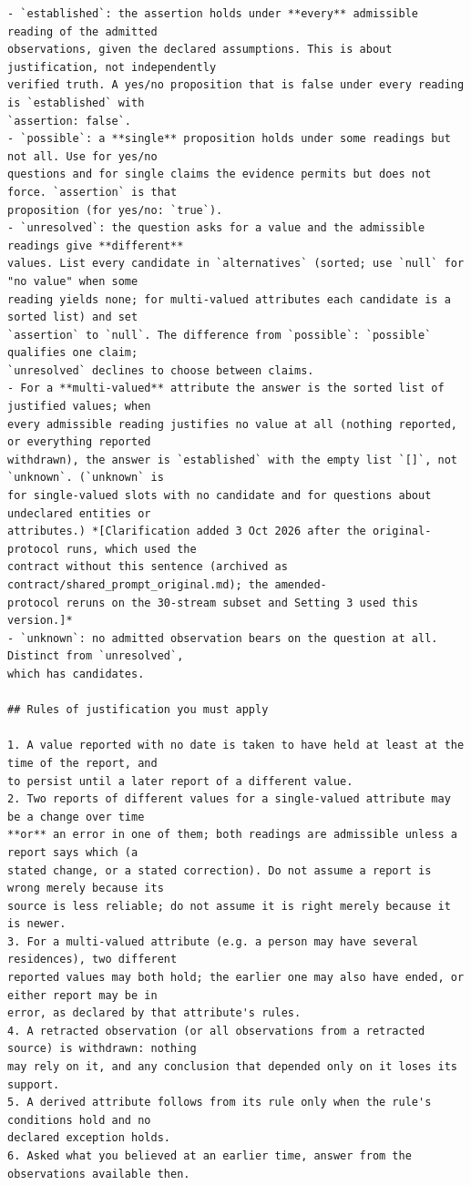 {\begin{verbatim}
- `established`: the assertion holds under **every** admissible reading of the admitted
observations, given the declared assumptions. This is about justification, not independently
verified truth. A yes/no proposition that is false under every reading is `established` with
`assertion: false`.
- `possible`: a **single** proposition holds under some readings but not all. Use for yes/no
questions and for single claims the evidence permits but does not force. `assertion` is that
proposition (for yes/no: `true`).
- `unresolved`: the question asks for a value and the admissible readings give **different**
values. List every candidate in `alternatives` (sorted; use `null` for "no value" when some
reading yields none; for multi-valued attributes each candidate is a sorted list) and set
`assertion` to `null`. The difference from `possible`: `possible` qualifies one claim;
`unresolved` declines to choose between claims.
- For a **multi-valued** attribute the answer is the sorted list of justified values; when
every admissible reading justifies no value at all (nothing reported, or everything reported
withdrawn), the answer is `established` with the empty list `[]`, not `unknown`. (`unknown` is
for single-valued slots with no candidate and for questions about undeclared entities or
attributes.) *[Clarification added 3 Oct 2026 after the original-protocol runs, which used the
contract without this sentence (archived as contract/shared_prompt_original.md); the amended-
protocol reruns on the 30-stream subset and Setting 3 used this version.]*
- `unknown`: no admitted observation bears on the question at all. Distinct from `unresolved`,
which has candidates.

## Rules of justification you must apply

1. A value reported with no date is taken to have held at least at the time of the report, and
to persist until a later report of a different value.
2. Two reports of different values for a single-valued attribute may be a change over time
**or** an error in one of them; both readings are admissible unless a report says which (a
stated change, or a stated correction). Do not assume a report is wrong merely because its
source is less reliable; do not assume it is right merely because it is newer.
3. For a multi-valued attribute (e.g. a person may have several residences), two different
reported values may both hold; the earlier one may also have ended, or either report may be in
error, as declared by that attribute's rules.
4. A retracted observation (or all observations from a retracted source) is withdrawn: nothing
may rely on it, and any conclusion that depended only on it loses its support.
5. A derived attribute follows from its rule only when the rule's conditions hold and no
declared exception holds.
6. Asked what you believed at an earlier time, answer from the observations available then.


\end{verbatim}}
